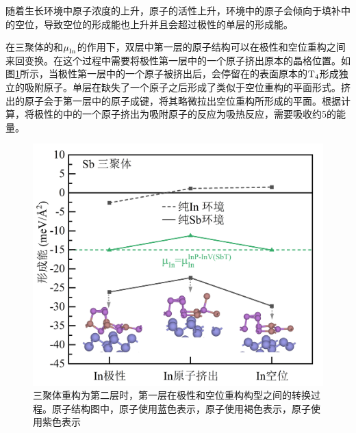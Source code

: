 随着生长环境中原子浓度的上升，原子的活性上升，环境中的原子会倾向于填补中的空位，导致空位的形成能也上升并且会超过极性的单层的形成能。

在三聚体的和$\it \mu_{\rm In}^{\rm } \it$的作用下，双层中第一层的原子结构可以在极性和空位重构之间来回变换。在这个过程中需要将极性第一层中的一个原子挤出原本的晶格位置。如图\ref{fig:IS_DFT_2InSb_InPtoInV}所示，当极性第一层中的一个原子被挤出后，会停留在的表面原本的$\rm T_{4} \it$形成独立的吸附原子。单层在缺失了一个原子之后形成了类似于空位重构的平面形式。挤出的原子会于第一层中的原子成键，将其略微拉出空位重构所形成的平面。根据计算，将极性的中的一个原子挤出为吸附原子的反应为吸热反应，需要吸收约\SI{5}{\mievpas}的能量。

\begin{figure}[htb]
    \includegraphics{pic/IS_DFT_2InSb_InPtoInV.png}
    \caption{三聚体重构为第二层时，第一层在极性和空位重构构型之间的转换过程。原子结构图中，原子使用蓝色表示，原子使用褐色表示，原子使用紫色表示}
    \label{fig:IS_DFT_2InSb_InPtoInV}
\end{figure}

